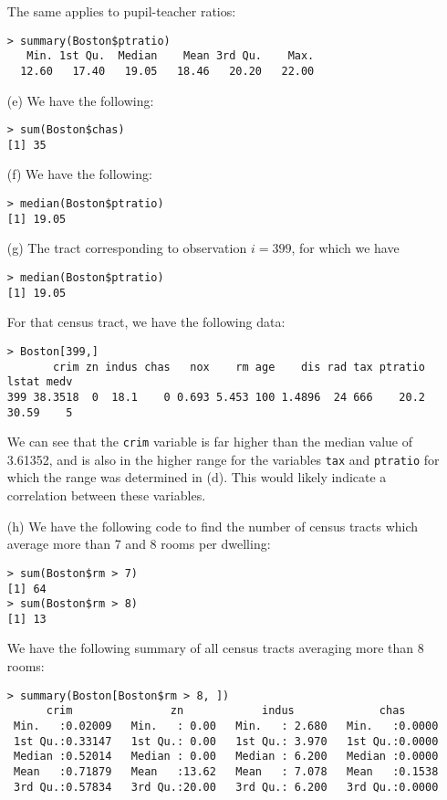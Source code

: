 \begin{itemize}
    The same applies to pupil-teacher ratios:
    \begin{verbatim}
> summary(Boston$ptratio)
   Min. 1st Qu.  Median    Mean 3rd Qu.    Max.
  12.60   17.40   19.05   18.46   20.20   22.00
    \end{verbatim}
    \item[(e)]
    We have the following:
    \begin{verbatim}
> sum(Boston$chas)
[1] 35
    \end{verbatim}
    \item[(f)]
    We have the following:
    \begin{verbatim}
> median(Boston$ptratio)
[1] 19.05
    \end{verbatim}
    \item[(g)]
    The tract corresponding to observation $i = 399$, for which we have
    \begin{verbatim}
> median(Boston$ptratio)
[1] 19.05
    \end{verbatim}
    For that census tract, we have the following data:
    \begin{verbatim}
> Boston[399,]
       crim zn indus chas   nox    rm age    dis rad tax ptratio lstat medv
399 38.3518  0  18.1    0 0.693 5.453 100 1.4896  24 666    20.2 30.59    5
    \end{verbatim}
    We can see that the \verb|crim| variable is far higher than the median 
    value of 3.61352, and is also in the higher range for the variables
    \verb|tax| and \verb|ptratio| for which the range was determined in (d).
    This would likely indicate a correlation between these variables.
    \item[(h)]
    We have the following code to find the number of census tracts which
    average more than 7 and 8 rooms per dwelling:
    \begin{verbatim}
> sum(Boston$rm > 7)
[1] 64
> sum(Boston$rm > 8)
[1] 13
    \end{verbatim}
    We have the following summary of all census tracts averaging more than 8
    rooms:
    \begin{verbatim}
> summary(Boston[Boston$rm > 8, ])
      crim               zn            indus             chas
 Min.   :0.02009   Min.   : 0.00   Min.   : 2.680   Min.   :0.0000
 1st Qu.:0.33147   1st Qu.: 0.00   1st Qu.: 3.970   1st Qu.:0.0000
 Median :0.52014   Median : 0.00   Median : 6.200   Median :0.0000
 Mean   :0.71879   Mean   :13.62   Mean   : 7.078   Mean   :0.1538
 3rd Qu.:0.57834   3rd Qu.:20.00   3rd Qu.: 6.200   3rd Qu.:0.0000

\end{verbatim}
\end{itemize}

